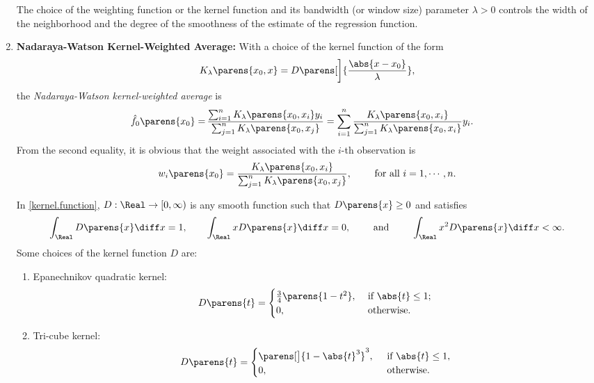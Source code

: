 \documentclass[12pt]{article}
\begin{document}
\begin{enumerate}[label=\textbf{\arabic*.}]
	The choice of the weighting function or the kernel function and its bandwidth (or window size) parameter $\lambda > 0$ controls the width of the neighborhood and the degree of the smoothness of the estimate of the regression function. 
	
	\item \textbf{Nadaraya-Watson Kernel-Weighted Average:} With a choice of the kernel function of the form 
	\begin{align}\label{kernel.function}
		K_{\lambda} \parens{x_0, x} = D \parens[\bigg]{\frac{\abs{x - x_0}}{\lambda}}, 
	\end{align}
	the \textit{Nadaraya-Watson kernel-weighted average} is 
	\begin{align}\label{eq-nw-kernel-avg}
		\hat{f}_0\parens{x_0} = & \, \frac{\sum_{i=1}^n K_{\lambda} \parens{x_0, x_i} y_i}{\sum_{j=1}^n K_{\lambda} \parens{x_0, x_j}}
		= \sum_{i=1}^n \frac{K_{\lambda} \parens{x_0, x_i}}{\sum_{j=1}^n K_{\lambda} \parens{x_0, x_i}} y_i. 
	\end{align}
	From the second equality, it is obvious that the weight associated with the $i$-th observation is 
	\begin{align*}
		w_i \parens{x_0} = \frac{K_{\lambda} \parens{x_0, x_i}}{\sum_{j=1}^n K_{\lambda} \parens{x_0, x_j}}, \qquad \text{ for all } i = 1, \cdots, n. 
	\end{align*}
	
	In \eqref{kernel.function}, $D: \Real \to [0, \infty)$ is any smooth function such that $D \parens{x} \ge 0$ and satisfies 
	\begin{align*}
		\int_{\Real} D \parens{x} \diff x = 1, \qquad \int_{\Real} x D \parens{x} \diff x = 0, \qquad \text{ and } \qquad \int_{\Real} x^2 D \parens{x} \diff x < \infty. 
	\end{align*}
	Some choices of the kernel function $D$ are: 
	\begin{enumerate}
		\item Epanechnikov quadratic kernel: 
		\begin{align*}
			D \parens{t} = \begin{cases}
				\frac{3}{4} \parens{1-t^2}, & \text{ if } \abs{t} \le 1; \\ 
				0, & \text{ otherwise}. 
			\end{cases}
		\end{align*}
		
		\item Tri-cube kernel: 
		\begin{align*}
			D \parens{t} = \begin{cases}
				\parens[\big]{1 - \abs{t}^3}^3, & \, \text{ if } \abs{t} \le 1, \\ 
				0, & \, \text{ otherwise. }
			\end{cases}
		\end{align*}
		

\end{enumerate}
\end{enumerate}
\end{document}
